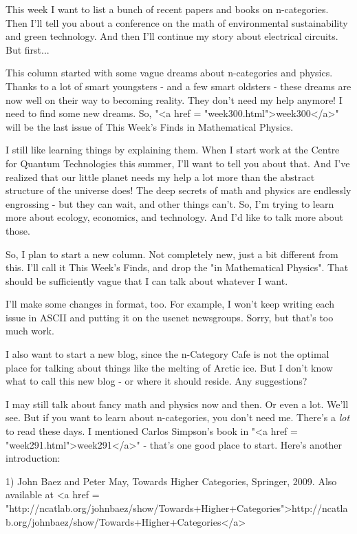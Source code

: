 

This week I want to list a bunch of recent papers and books on
n-categories.  Then I'll tell you about a conference on the math of
environmental sustainability and green technology.  And then I'll
continue my story about electrical circuits.  But first...

This column started with some vague dreams about n-categories and
physics.  Thanks to a lot of smart youngsters - and a few smart
oldsters - these dreams are now well on their way to becoming reality.
They don't need my help anymore!  I need to find some new dreams.  So,
"<a href = "week300.html">week300</a>" will be the last
issue of This Week's Finds in Mathematical Physics.

I still like learning things by explaining them.  When I start work at
the Centre for Quantum Technologies this summer, I'll want to tell you
about that.  And I've realized that our little planet needs my help a
lot more than the abstract structure of the universe does!  The deep
secrets of math and physics are endlessly engrossing - but they can
wait, and other things can't.  So, I'm trying to learn more about ecology, 
economics, and technology.  And I'd like to talk more about those.

So, I plan to start a new column.  Not completely new, just a bit
different from this.  I'll call it This Week's Finds, and drop the
"in Mathematical Physics".  That should be sufficiently
vague that I can talk about whatever I want.

I'll make some changes in format, too.  For example, I won't keep
writing each issue in ASCII and putting it on the usenet newsgroups.
Sorry, but that's too much work.

I also want to start a new blog, since the n-Category Cafe is not the
optimal place for talking about things like the melting of Arctic ice.
But I don't know what to call this new blog - or where it should
reside.  Any suggestions?

I may still talk about fancy math and physics now and then.  Or even a
lot.  We'll see.  But if you want to learn about n-categories, you don't
need me.  There's a \emph{lot} to read these days.  I mentioned Carlos 
Simpson's book in "<a href = "week291.html">week291</a>" - 
that's one good place to start.  Here's another introduction:

1) John Baez and Peter May, Towards Higher Categories, Springer, 2009.
Also available at <a href = "http://ncatlab.org/johnbaez/show/Towards+Higher+Categories">http://ncatlab.org/johnbaez/show/Towards+Higher+Categories</a>

